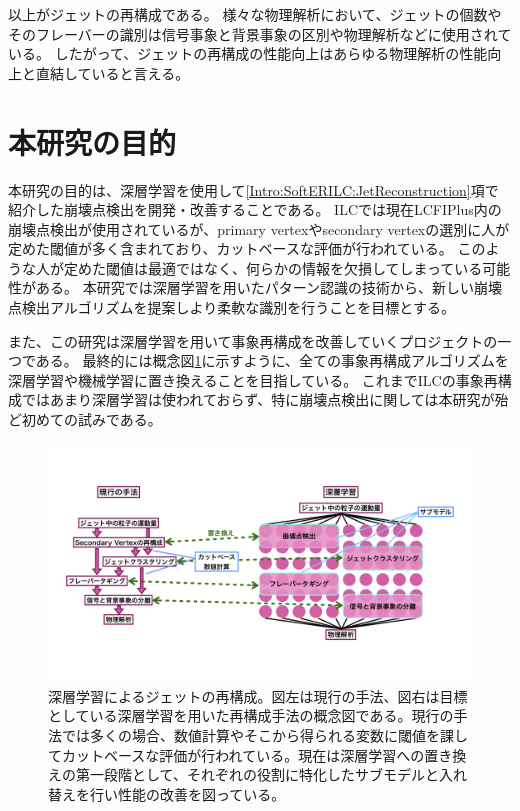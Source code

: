 以上がジェットの再構成である。
様々な物理解析において、ジェットの個数やそのフレーバーの識別は信号事象と背景事象の区別や物理解析などに使用されている。
したがって、ジェットの再構成の性能向上はあらゆる物理解析の性能向上と直結していると言える。


\section{本研究の目的} \label{Intro:Purpose}

本研究の目的は、深層学習を使用して\ref{Intro:SoftERILC:JetReconstruction}項で紹介した崩壊点検出を開発・改善することである。
ILCでは現在LCFIPlus内の崩壊点検出が使用されているが、primary vertexやsecondary vertexの選別に人が定めた閾値が多く含まれており、カットベースな評価が行われている。
このような人が定めた閾値は最適ではなく、何らかの情報を欠損してしまっている可能性がある。
本研究では深層学習を用いたパターン認識の技術から、新しい崩壊点検出アルゴリズムを提案しより柔軟な識別を行うことを目標とする。

また、この研究は深層学習を用いて事象再構成を改善していくプロジェクトの一つである。
最終的には概念図\ref{7JetReconstructionwithDeepLearning}に示すように、全ての事象再構成アルゴリズムを深層学習や機械学習に置き換えることを目指している。
これまでILCの事象再構成ではあまり深層学習は使われておらず、特に崩壊点検出に関しては本研究が殆ど初めての試みである。

\begin{figure}[htbp]
 \centering
 \includegraphics[trim = 0 100 0 50, width=1.0\textwidth, clip]{Figure/1Introduction/7JetReconstructionwithDeepLearning.png}
 \caption[深層学習によるジェットの再構成]{深層学習によるジェットの再構成。図左は現行の手法、図右は目標としている深層学習を用いた再構成手法の概念図である。現行の手法では多くの場合、数値計算やそこから得られる変数に閾値を課してカットベースな評価が行われている。現在は深層学習への置き換えの第一段階として、それぞれの役割に特化したサブモデルと入れ替えを行い性能の改善を図っている。}
 \label{7JetReconstructionwithDeepLearning}
\end{figure}

